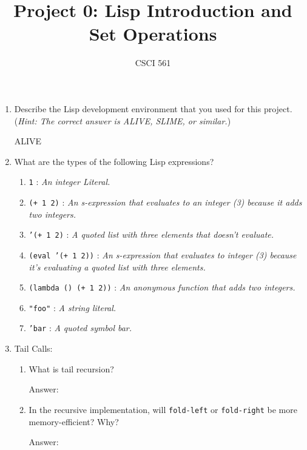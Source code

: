 \documentclass[12pt,letterpaper]{ntdhw}
\title{Project 0: Lisp Introduction and Set Operations}
\author{CSCI 561}
\begin{document}
\pagestyle{fancyplain}

\maketitle
\thispagestyle{fancyplain}

\begin{enumerate}

  \item Describe the Lisp development environment that you used for
  this project.  (\emph{Hint: The correct answer is ALIVE, SLIME, or
    similar.})

    ALIVE

  \item What are the types of the following Lisp expressions?
  \begin{enumerate}
    \item {\tt 1} : \emph{
      An integer Literal.
    }
    \item {\tt (+ 1 2)} : \emph{
      An s-expression that evaluates to an integer (3) because it adds two integers.
    }
    \item {\tt '(+ 1 2)} : \emph{
      A quoted list with three elements that doesn't evaluate.
    }
    \item {\tt (eval '(+ 1 2))} : \emph{
      An s-expression that evaluates to integer (3) because it's evaluating a quoted list with three elements.
    }
    \item {\tt (lambda () (+ 1 2))} : \emph{
      An anonymous function that adds two integers.
    }
    \item {\tt "foo"} : \emph{
      A string literal.
    }
    \item {\tt 'bar} : \emph{
      A quoted symbol bar.
    }
  \end{enumerate}

  \item Tail Calls:
  \begin{enumerate}
    \item What is tail recursion?

    \begin{emph}
      Answer: %
    \end{emph}

    \item In the recursive implementation, will {\tt fold-left} or
    {\tt fold-right} be more memory-efficient?  Why?

    \begin{emph}
      Answer: %
    \end{emph}
  \end{enumerate}


\end{enumerate}
\end{document}
